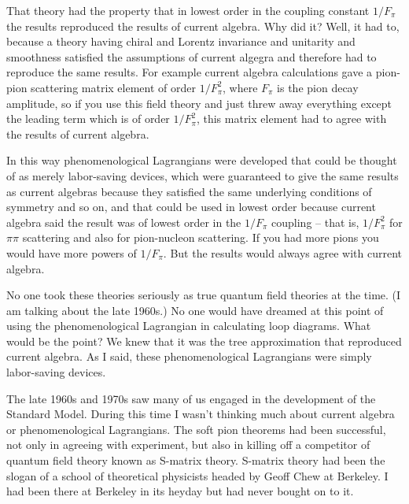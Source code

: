 \documentclass[12pt]{article}
\begin{document}
That theory had the property that in lowest order in the coupling constant $1/F_\pi$ the results reproduced the results of current algebra.  Why did it? Well, it had to, because a theory having  chiral and Lorentz invariance and  unitarity and smoothness satisfied the assumptions of current algegra and therefore had to reproduce the same results.  For example  current algebra calculations gave a pion-pion scattering  matrix element of order $1/F_\pi^2$, where $F_\pi$ is the pion decay amplitude, so if you use this field theory and just threw away everything except the leading term which is of order  $1/F_\pi^2$, this matrix element had to agree with the results of current algebra. 

In this way phenomenological Lagrangians were developed that could be thought of as merely labor-saving devices, which were guaranteed to give the same results as current algebras because they satisfied the same underlying conditions of symmetry and so on, and that could be used in lowest order because current algebra said the result was of lowest order in  the $1/F_\pi$ coupling -- that is, $1/F_\pi^2$ for $\pi\pi$ scattering and also for pion-nucleon scattering. If you had more pions you would have more powers of $1/F_\pi$. But the results would always agree with current algebra.

No one took these theories seriously  as true quantum field theories at the time. (I am talking about the late 1960s.)  No one would have dreamed at this point of using the phenomenological Lagrangian in calculating loop diagrams. What would be the point? We knew that it was the tree approximation that reproduced current algebra. As I said, these phenomenological Lagrangians were simply labor-saving devices. 

The late 1960s and 1970s saw many of us engaged in the development of the Standard Model. During this time I wasn't thinking much about current algebra or phenomenological Lagrangians. The soft pion theorems had been successful,  not only in agreeing with experiment, but also in killing off a competitor of quantum field theory known as S-matrix theory. S-matrix theory had been the slogan of a school of theoretical physicists headed by Geoff Chew at Berkeley. I had been there at Berkeley in its heyday but had never bought on to it. 
\end{document}
